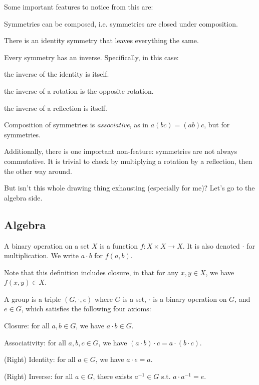 \documentclass[12pt]{article}
\begin{document}
Some important features to notice from this are:
\begin{compactitem}
\item Symmetries can be composed, 
    i.e. symmetries are closed under composition.
\item There is an identity symmetry that leaves everything the same.
\item Every symmetry has an inverse. Specifically, in this case:
    \begin{compactitem}
    \item the inverse of the identity is itself.
    \item the inverse of a rotation is the opposite rotation.
    \item the inverse of a reflection is itself.
    \end{compactitem}
\item Composition of symmetries is \emph{associative},
    as in $a(bc) = (ab)c$, but for symmetries.
\end{compactitem}
Additionally, there is one important non-feature: 
symmetries are not always commutative. 
It is trivial to check by multiplying a rotation by a reflection,
then the other way around.

But isn't this whole drawing thing exhausting (especially for me)?
Let's go to the algebra side.

\subsection{Algebra}

\begin{definition}
    A binary operation on a set $X$ is
    a function $f : X \times X \to X$.
    It is also denoted $\cdot$ for multiplication.
    We write $a \cdot b$ for $f(a,b)$.
\end{definition}

Note that this definition includes closure,
in that for any $x,y \in X$, we have $f(x,y) \in X$.

\begin{definition}
    A group is a triple $(G,\cdot,e)$ where
    $G$ is a set, $\cdot$ is a binary operation on $G$,
    and $e \in G$, which satisfies the following four axioms:
    \begin{compactenum}[(i)]
    \item Closure: for all $a,b \in G$, we have $a \cdot b \in G$.
    \item Associativity: for all $a,b,c \in G$, we have $(a \cdot b) \cdot c = a \cdot (b \cdot c)$.
    \item (Right) Identity: for all $a \in G$, we have $a \cdot e = a$.
    \item (Right) Inverse: for all $a \in G$, there exists $a^{-1} \in G$ s.t. $a \cdot a^{-1} = e$.
    \end{compactenum}
\end{definition}
\end{document}
